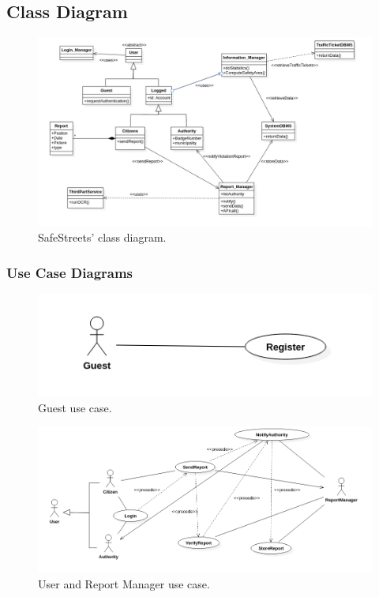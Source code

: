 \documentclass{report}
\begin{document}
\subsection{Class Diagram}
\begin{figure}[!ht]
\begin{center}
\includegraphics[width=\textwidth]{./img/SWE1.png}
\end{center}
\caption{SafeStreets' class diagram.}
\label{fig:UML}
\end{figure} 

\newpage

\subsubsection{Use Case Diagrams}

\begin{figure}[ht!]
\begin{center}
\includegraphics[width=.8\textwidth]{./img/UseCase1.png}
\end{center}
\caption{Guest use case.}
\label{fig:UseCase1}
\end{figure}

\begin{figure}[ht!]
\begin{center}
\includegraphics[width=.8\textwidth]{./img/UseCase2.png}
\end{center}
\caption{User and Report Manager use case.}
\label{fig:UseCase2}
\end{figure}
\end{document}
